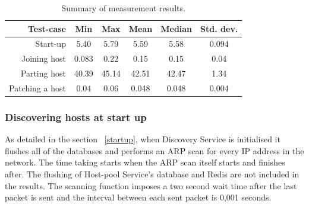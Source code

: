 
\begin{table}[t]
\centering
\begin{tabular}{  r | c | c | c | c | c }
{\bf Test-case} & {\bf Min} & {\bf Max} & {\bf Mean} & {\bf Median} & {\bf Std. dev.} \\
\hline
Start-up & 5.40 & 5.79 & 5.59 & 5.58 & 0.094 \\
Joining host & 0.083 & 0.22 & 0.15 & 0.15 & 0.04 \\
Parting host & 40.39 & 45.14 & 42.51 & 42.47 & 1.34 \\
Patching a host & 0.04 & 0.06 & 0.048 & 0.048 & 0.004 \\ 
\end{tabular}
\caption{Summary of measurement results.}
\label{table:measurements}
\end{table}

\subsubsection{Discovering hosts at start up}

As detailed in the section ~\ref{startup}, when Discovery Service is initialised it flushes all of the databases and performs an ARP scan for every IP address in the network. The time taking starts when the ARP scan itself starts and finishes after. The flushing of Host-pool Service's database and Redis are not included in the results. The scanning function imposes a two second wait time after the last packet is sent and the interval between each sent packet is 0,001 seconds.

